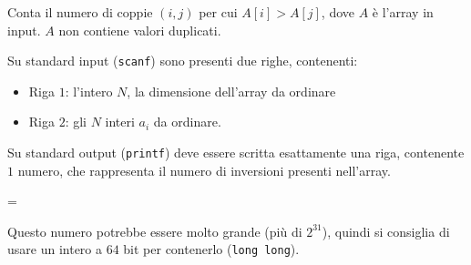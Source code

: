 \usepackage{xcolor}
\usepackage{afterpage}
\usepackage{pifont,mdframed}
\usepackage[bottom]{footmisc}


\renewcommand{\inputfile}{\texttt{stdin}}
\renewcommand{\outputfile}{\texttt{stdout}}
\makeatletter
\renewcommand{\this@inputfilename}{\texttt{stdin}}
\renewcommand{\this@outputfilename}{\texttt{stdout}}
\makeatother


\newenvironment{warning}
  {\par\begin{mdframed}[linewidth=2pt,linecolor=gray]%
    \begin{list}{}{\leftmargin=1cm
                   \labelwidth=\leftmargin}\item[\Large\ding{43}]}
  {\end{list}\end{mdframed}\par}


    Conta il numero di coppie $(i, j)$ per cui $A[i] > A[j]$, dove $A$ è l'array in input.
    $A$ non contiene valori duplicati.



\InputFile
Su standard input (\texttt{scanf}) sono presenti due righe, contenenti:
\begin{itemize}[nolistsep,itemsep=2mm]
\item Riga $1$: l'intero $N$, la dimensione dell'array da ordinare
\item Riga $2$: gli $N$ interi $a_i$ da ordinare.
\end{itemize}

\OutputFile
Su standard output (\texttt{printf}) deve essere scritta esattamente una riga,
contenente $1$ numero, che rappresenta il numero di inversioni presenti nell'array.

\begin{warning}
  Questo numero potrebbe essere molto grande (più di $2^{31}$), quindi si consiglia
    di usare un intero a $64$ bit per contenerlo (\texttt{long long}).
\end{warning}
	


